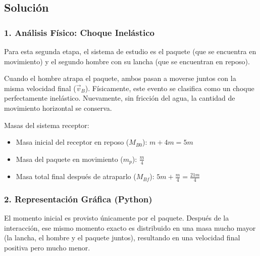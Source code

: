 \documentclass[12pt, a4paper]{article}
\begin{document}
\begin{center}
\end{center}

\subsection*{Solución}

\subsubsection*{1. Análisis Físico: Choque Inelástico}
Para esta segunda etapa, el sistema de estudio es el paquete (que se encuentra en movimiento) y el segundo hombre con su lancha (que se encuentran en reposo). 

Cuando el hombre atrapa el paquete, ambos pasan a moverse juntos con la misma velocidad final ($\vec{v}_B$). Físicamente, este evento se clasifica como un choque perfectamente inelástico. Nuevamente, sin fricción del agua, la cantidad de movimiento horizontal se conserva.

Masas del sistema receptor:
\begin{itemize}
    \item Masa inicial del receptor en reposo ($M_{B0}$): $m + 4m = 5m$
    \item Masa del paquete en movimiento ($m_p$): $\frac{m}{4}$
    \item Masa total final después de atraparlo ($M_{Bf}$): $5m + \frac{m}{4} = \frac{21m}{4}$
\end{itemize}

\subsubsection*{2. Representación Gráfica (Python)}
El momento inicial es provisto únicamente por el paquete. Después de la interacción, ese mismo momento exacto es distribuido en una masa mucho mayor (la lancha, el hombre y el paquete juntos), resultando en una velocidad final positiva pero mucho menor.
\end{document}
